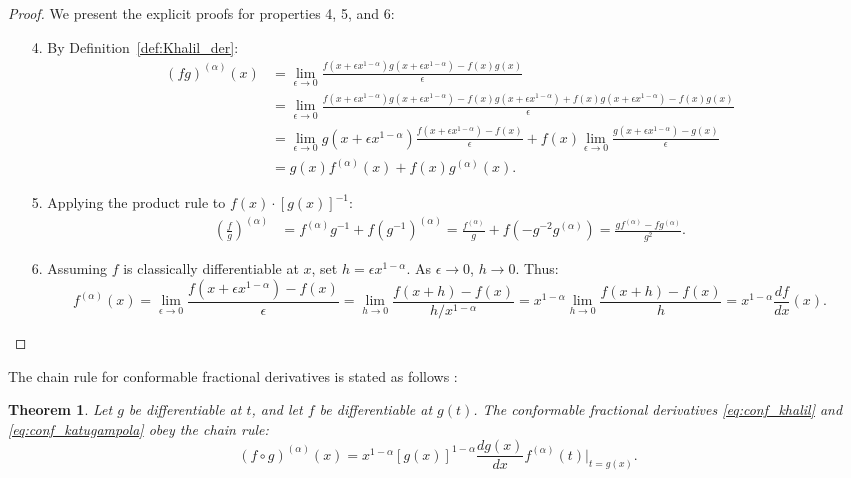 \documentclass[oneside,10pt]{article}
\theoremstyle{plain}
\newtheorem{theorem}{Theorem}[section]
\theoremstyle{definition}
\begin{document}
\begin{proof}
We present the explicit proofs for properties 4, 5, and 6:
\begin{enumerate}
    \item[4.] By Definition~\ref{def:Khalil_der}:
    \begin{align*}
    (fg)^{(\alpha)}(x) &= \lim_{\epsilon \to 0} \frac{f(x + \epsilon x^{1-\alpha}) g(x + \epsilon x^{1-\alpha}) - f(x)g(x)}{\epsilon} \\
    &= \lim_{\epsilon \to 0} \frac{f(x + \epsilon x^{1-\alpha}) g(x + \epsilon x^{1-\alpha}) - f(x)g(x + \epsilon x^{1-\alpha}) + f(x)g(x + \epsilon x^{1-\alpha}) - f(x)g(x)}{\epsilon} \\
    &= \lim_{\epsilon \to 0} g(x + \epsilon x^{1-\alpha}) \frac{f(x + \epsilon x^{1-\alpha}) - f(x)}{\epsilon} + f(x) \lim_{\epsilon \to 0} \frac{g(x + \epsilon x^{1-\alpha}) - g(x)}{\epsilon} \\
    &= g(x) f^{(\alpha)}(x) + f(x) g^{(\alpha)}(x).
    \end{align*}
    
    \item[5.] Applying the product rule to $f(x) \cdot [g(x)]^{-1}$:
    \begin{align*}
    \left(\frac{f}{g}\right)^{(\alpha)} &= f^{(\alpha)} g^{-1} + f \left(g^{-1}\right)^{(\alpha)} = \frac{f^{(\alpha)}}{g} + f \left( -g^{-2} g^{(\alpha)} \right) = \frac{g f^{(\alpha)} - f g^{(\alpha)}}{g^2}.
    \end{align*}

    \item[6.] Assuming $f$ is classically differentiable at $x$, set $h = \epsilon x^{1-\alpha}$. As $\epsilon \to 0$, $h \to 0$. Thus:
    \[
    f^{(\alpha)}(x) = \lim_{\epsilon \to 0} \frac{f(x + \epsilon x^{1-\alpha}) - f(x)}{\epsilon} = \lim_{h \to 0} \frac{f(x + h) - f(x)}{h / x^{1-\alpha}} = x^{1-\alpha} \lim_{h \to 0} \frac{f(x + h) - f(x)}{h} = x^{1-\alpha} \frac{df}{dx}(x).
    \]
\end{enumerate}
\end{proof}

The chain rule for conformable fractional derivatives is stated as follows \cite{Atangana2015}:

\begin{theorem}\cite{Atangana2015}
Let $g$ be differentiable at $t$, and let $f$ be differentiable at $g(t)$. The conformable fractional derivatives \eqref{eq:conf_khalil} and \eqref{eq:conf_katugampola} obey the chain rule:
\begin{equation}
(f \circ g)^{(\alpha)}(x) = x^{1-\alpha} [g(x)]^{1-\alpha} \frac{dg(x)}{dx} f^{(\alpha)}(t)\Big|_{t=g(x)}.
\end{equation}
\end{theorem}
\end{document}
